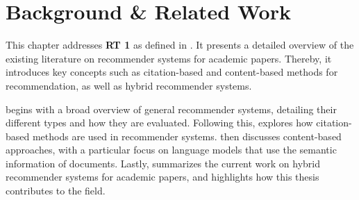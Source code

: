 \chapter{Background \& Related Work} \label{sec:background-related-work}

This chapter addresses \textbf{\ac{RT} 1} as defined in . It presents a detailed overview of the existing literature on recommender systems for academic papers. Thereby, it introduces key concepts such as citation-based and content-based methods for recommendation, as well as hybrid recommender systems.

 begins with a broad overview of general recommender systems, detailing their different types and how they are evaluated. Following this,  explores how citation-based methods are used in recommender systems.  then discusses content-based approaches, with a particular focus on language models that use the semantic information of documents. Lastly,  summarizes the current work on hybrid recommender systems for academic papers, and highlights how this thesis contributes to the field.
